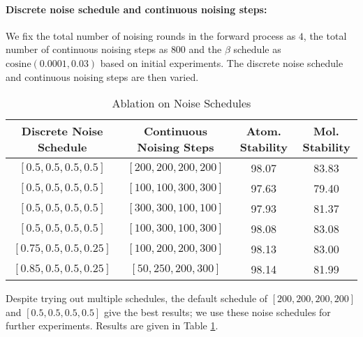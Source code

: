 \paragraph{Discrete noise schedule and continuous noising steps:}
We fix the total number of noising rounds in the forward process as $4$, the total number of continuous noising steps as $800$ and the $\beta$ schedule as $\text{cosine}(0.0001, 0.03)$ based on initial experiments. The discrete noise schedule and continuous noising steps are then varied.
\begin{table}[h]
    \centering
    \begin{tabular}{c c c c}
    \toprule
  Discrete Noise Schedule & Continuous Noising Steps &  Atom. Stability & Mol. Stability \\
  \midrule
  $[0.5, 0.5, 0.5, 0.5]$  & $[200, 200, 200, 200]$ & 98.07 & 83.83 \\
  $[0.5, 0.5, 0.5, 0.5]$  & $[100, 100, 300, 300]$ & 97.63 & 79.40 \\
  $[0.5, 0.5, 0.5, 0.5]$  & $[300, 300, 100, 100]$ & 97.93 & 81.37 \\
  $[0.5, 0.5, 0.5, 0.5]$  & $[100, 300, 100, 300]$ & 98.08 & 83.08 \\
  $[0.75, 0.5, 0.5, 0.25]$ & $[100, 200, 200, 300]$ & 98.13 & 83.00 \\
  $[0.85, 0.5, 0.5, 0.25]$ & $[50, 250, 200, 300]$ & 98.14 & 81.99 \\
  \bottomrule
\end{tabular}
    \caption{Ablation on Noise Schedules}
    \label{tab:abl_qm9_noise}
\end{table}
Despite trying out multiple schedules, the default schedule of $[200, 200, 200, 200]$ and $[0.5, 0.5, 0.5, 0.5]$ give the best results; we use these noise schedules for further experiments. Results are given in Table \ref{tab:abl_qm9_noise}.

